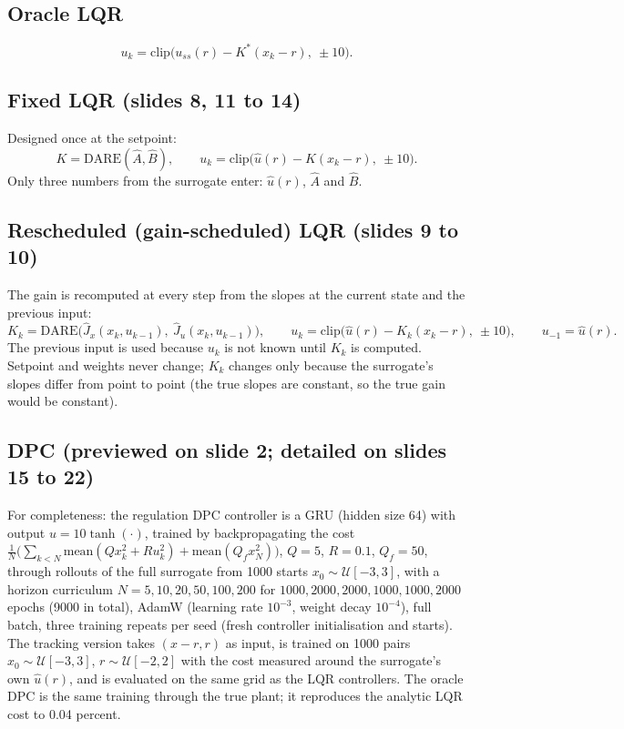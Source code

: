 \documentclass[11pt]{article}
\begin{document}
\subsection{Oracle LQR}
\begin{equation}
u_k = \mathrm{clip}\big(u_{ss}(r) - K^*(x_k-r),\ \pm10\big).
\end{equation}

\subsection{Fixed LQR (slides 8, 11 to 14)}
Designed once at the setpoint:
\begin{equation}
K = \mathrm{DARE}(\hat A,\hat B),\qquad u_k = \mathrm{clip}\big(\hat u(r) - K(x_k-r),\ \pm10\big).
\end{equation}
Only three numbers from the surrogate enter: $\hat u(r)$, $\hat A$ and $\hat B$.

\subsection{Rescheduled (gain-scheduled) LQR (slides 9 to 10)}
The gain is recomputed at every step from the slopes at the current state and the previous input:
\begin{equation}
K_k = \mathrm{DARE}\big(\hat J_x(x_k,u_{k-1}),\ \hat J_u(x_k,u_{k-1})\big),\qquad u_k = \mathrm{clip}\big(\hat u(r) - K_k(x_k-r),\ \pm10\big),\qquad u_{-1}=\hat u(r).
\end{equation}
The previous input is used because $u_k$ is not known until $K_k$ is computed. Setpoint and weights never change; $K_k$ changes only because the surrogate's slopes differ from point to point (the true slopes are constant, so the true gain would be constant).

\subsection{DPC (previewed on slide 2; detailed on slides 15 to 22)}\label{sec:dpcctrl}
For completeness: the regulation DPC controller is a GRU (hidden size 64) with output $u=10\tanh(\cdot)$, trained by backpropagating the cost
$\frac1N\big(\sum_{k<N}\mathrm{mean}(Qx_k^2+Ru_k^2)+\mathrm{mean}(Q_fx_N^2)\big)$, $Q=5$, $R=0.1$, $Q_f=50$, through rollouts of the full surrogate from 1000 starts $x_0\sim\mathcal U[-3,3]$, with a horizon curriculum $N=5,10,20,50,100,200$ for $1000,2000,2000,1000,1000,2000$ epochs (9000 in total), AdamW (learning rate $10^{-3}$, weight decay $10^{-4}$), full batch, three training repeats per seed (fresh controller initialisation and starts). The tracking version takes $(x-r,r)$ as input, is trained on 1000 pairs $x_0\sim\mathcal U[-3,3]$, $r\sim\mathcal U[-2,2]$ with the cost measured around the surrogate's own $\hat u(r)$, and is evaluated on the same grid as the LQR controllers. The oracle DPC is the same training through the true plant; it reproduces the analytic LQR cost to 0.04 percent.
\end{document}
